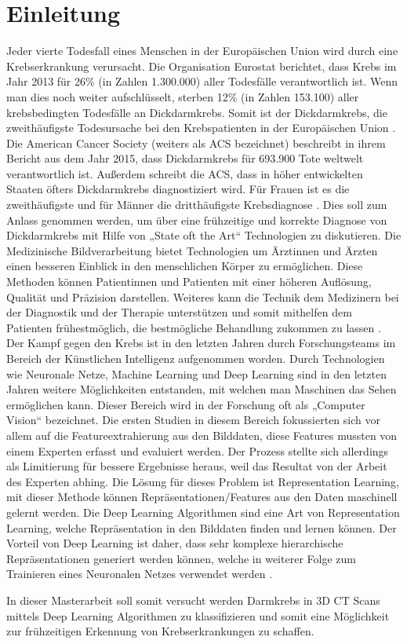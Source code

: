 \section{Einleitung}
Jeder vierte Todesfall eines Menschen in der Europäischen Union wird durch eine Krebserkrankung verursacht. Die Organisation Eurostat berichtet, dass Krebs im Jahr 2013 für 26\% (in Zahlen 1.300.000) aller Todesfälle verantwortlich ist. Wenn man dies noch weiter aufschlüsselt, sterben 12\% (in Zahlen 153.100) aller krebsbedingten Todesfälle an Dickdarmkrebs. Somit ist der Dickdarmkrebs, die zweithäufigste Todesursache bei den Krebspatienten in der Europäischen Union \cite{Eurostat2016}. Die American Cancer Society (weiters als ACS bezeichnet) beschreibt in ihrem Bericht aus dem Jahr 2015, dass Dickdarmkrebs für 693.900 Tote weltwelt verantwortlich ist.  Außerdem schreibt die ACS, dass in höher entwickelten Staaten öfters Dickdarmkrebs diagnostiziert wird. Für Frauen ist es die zweithäufigste und für Männer die dritthäufigste Krebsdiagnose \cite{Torre2015}. Dies soll zum Anlass genommen werden, um über eine frühzeitige und korrekte Diagnose von Dickdarmkrebs mit Hilfe von „State oft the Art“ Technologien zu diskutieren. Die Medizinische Bildverarbeitung bietet Technologien um Ärztinnen und Ärzten einen besseren Einblick in den menschlichen Körper zu ermöglichen. Diese Methoden können Patientinnen und Patienten mit einer höheren Auflösung, Qualität und Präzision darstellen. Weiteres kann die Technik dem Medizinern bei der Diagnostik und der Therapie unterstützen und somit mithelfen dem Patienten frühestmöglich, die bestmögliche Behandlung zukommen zu lassen \cite{Handels2009}. Der Kampf gegen den Krebs ist in den letzten Jahren durch Forschungsteams im Bereich der Künstlichen Intelligenz aufgenommen worden. Durch Technologien wie Neuronale Netze, Machine Learning und Deep Learning sind in den letzten Jahren weitere Möglichkeiten entstanden, mit welchen man Maschinen das Sehen ermöglichen kann. Dieser Bereich wird in der Forschung oft als „Computer Vision“ bezeichnet. Die ersten Studien in diesem Bereich fokussierten sich vor allem auf die Featureextrahierung aus den Bilddaten, diese Features mussten von einem Experten erfasst und evaluiert werden. Der Prozess stellte sich allerdings als Limitierung für bessere Ergebnisse heraus, weil das Resultat von der Arbeit des Experten abhing. Die Lösung für dieses Problem ist Representation Learning, mit dieser Methode können Repräsentationen/Features aus den Daten maschinell gelernt werden. Die Deep Learning Algorithmen sind eine Art von Representation Learning, welche Repräsentation in den Bilddaten finden und lernen können. Der Vorteil von Deep Learning ist daher, dass sehr komplexe hierarchische Repräsentationen generiert werden können, welche in weiterer Folge zum Trainieren eines Neuronalen Netzes verwendet werden \cite{Hu2018}. 

In dieser Masterarbeit soll somit versucht werden Darmkrebs in 3D CT Scans mittels Deep Learning Algorithmen zu klassifizieren und somit eine Möglichkeit zur frühzeitigen Erkennung von Krebserkrankungen zu schaffen.
